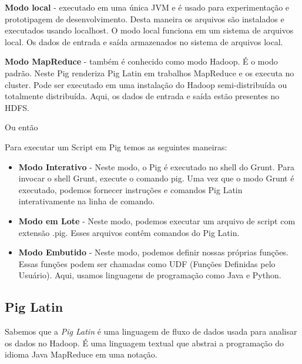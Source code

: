 \documentclass[a4paper,11pt]{article}
\begin{document}
\textbf{Modo local} - executado em uma única JVM e é usado para experimentação e prototipagem de desenvolvimento. Desta maneira os arquivos são instalados e executados usando localhost. O modo local funciona em um sistema de arquivos local. Os dados de entrada e saída armazenados no sistema de arquivos local. \\

\textbf{Modo MapReduce} - também é conhecido como modo Hadoop. É o modo padrão. Neste Pig renderiza Pig Latin em trabalhos MapReduce e os executa no cluster. Pode ser executado em uma instalação do Hadoop semi-distribuída ou totalmente distribuída. Aqui, os dados de entrada e saída estão presentes no HDFS. \\

Ou então \\

Para executar um Script em Pig temos as seguintes maneiras: \vspace{-1em}
\begin{itemize}
	\item \textbf{Modo Interativo} - Neste modo, o Pig é executado no shell do Grunt. Para invocar o shell Grunt, execute o comando pig. Uma vez que o modo Grunt é executado, podemos fornecer instruções e comandos Pig Latin interativamente na linha de comando.
	\item \textbf{Modo em Lote} - Neste modo, podemos executar um arquivo de script com extensão .pig. Esses arquivos contêm comandos do Pig Latin.
	\item \textbf{Modo Embutido} - Neste modo, podemos definir nossas próprias funções. Essas funções podem ser chamadas como UDF (Funções Definidas pelo Usuário). Aqui, usamos linguagens de programação como Java e Python.
\end{itemize}

\subsection{Pig Latin}
Sabemos que a \textit{Pig Latin} é uma linguagem de fluxo de dados usada para analisar os dados no Hadoop. É uma linguagem textual que abstrai a programação do idioma Java MapReduce em uma notação.
\end{document}
